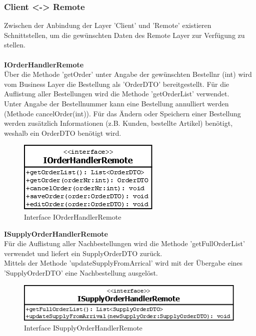 \clearpage






\subsubsection{Client <-> Remote}
Zwischen der Anbindung der Layer 'Client' und 'Remote' existieren Schnittstellen, um die gewünschten Daten des Remote Layer zur Verfügung zu stellen.\\\\

\textbf{IOrderHandlerRemote}\\
Über die Methode 'getOrder' unter Angabe der gewünschten Bestellnr (int) wird vom Business Layer die Bestellung als 'OrderDTO' bereitgestellt. Für die Auflistung aller Bestellungen wird die Methode 'getOrderList' verwendet.\\
Unter Angabe der Bestellnummer kann eine Bestellung annulliert werden (Methode cancelOrder(int)). Für das Ändern oder Speichern einer Bestellung werden zusätzlich Informationen (z.B. Kunden, bestellte Artikel) benötigt, weshalb ein OrderDTO benötigt wird.


\begin{figure}[H]
	\includegraphics[width=0.3\linewidth]{Images/IOrderHandlerRemote}
	\caption{Interface IOrderHandlerRemote}
	\label{fig:if-IOrderHandlerRemote}
\end{figure}

\textbf{ISupplyOrderHandlerRemote}\\
Für die Auflistung aller Nachbestellungen wird die Methode 'getFullOrderList' verwendet und liefert ein SupplyOrderDTO zurück.\\
Mittels der Methode 'updateSupplyFromArrical' wird mit der Übergabe eines 'SupplyOrderDTO' eine Nachbestellung ausgelöst. 
\begin{figure}[H]
	\includegraphics[width=0.6\linewidth]{Images/ISupplyOrderHandlerRemote}
	\caption{Interface ISupplyOrderHandlerRemote}
	\label{fig:if-ISupplyOrderHandlerRemote}
\end{figure}


